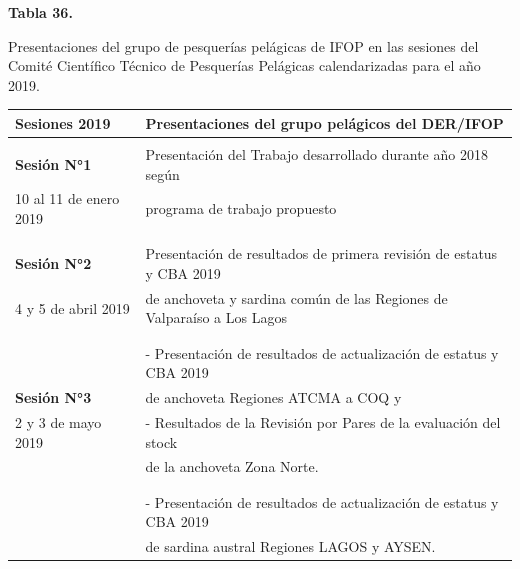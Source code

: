 \documentclass[
  spanish,
]{article}
\begin{document}
\pagebreak

\small
\begin{center} 
\textbf{Tabla 36.}
\end{center}
\begin{center} 
\vspace{-0.2cm} Presentaciones del grupo de pesquerías pelágicas de IFOP en las sesiones del Comité Científico Técnico de Pesquerías Pelágicas calendarizadas para el año 2019.
\end{center}
\vspace{-0.2cm}

\begin{table}[h]
  \centering
  \resizebox{16cm}{!} {
  \begin{tabular}{|l|l|}
  \hline
  Sesiones 2019           & Presentaciones del grupo pelágicos del DER/IFOP \\ \hline
                          & \\
  \textbf{Sesión N°1}       & Presentación del Trabajo desarrollado durante año 2018 según  \\ 
  10 al 11 de enero 2019  & programa de trabajo propuesto \\ 
                          & \\ \hline
                          & \\
  \textbf{Sesión N°2}       & Presentación de resultados de primera revisión de estatus y CBA 2019  \\
  4 y 5 de abril 2019     & de anchoveta y sardina común de las Regiones de Valparaíso a Los Lagos \\ 
                          & \\ \hline
                          & \\
                          & -   Presentación de resultados de actualización de estatus y CBA 2019 \\
  \textbf{Sesión N°3}     &   de anchoveta Regiones ATCMA a COQ y \\
  2 y 3 de mayo 2019      & -   Resultados de la Revisión por Pares de la evaluación del stock \\
                          &   de la anchoveta Zona Norte. \\ 
                          & \\ \hline
                          & \\
                            & - Presentación de resultados de actualización de estatus y CBA 2019 \\
                          &   de sardina austral Regiones LAGOS y AYSEN. \\

\end{tabular}}
\end{table}
\end{document}
